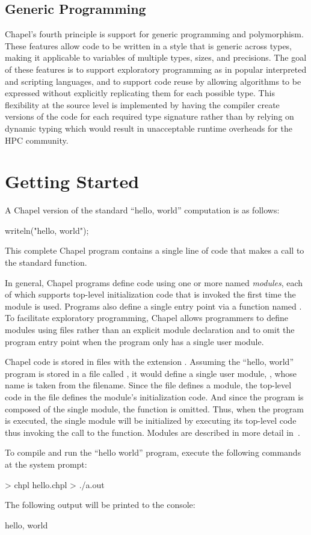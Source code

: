 \subsection{Generic Programming}
\label{Generic_Programming}

Chapel's fourth principle is support for generic programming and
polymorphism.  These features allow code to be written in a style that
is generic across types, making it applicable to variables of multiple
types, sizes, and precisions.  The goal of these features is to
support exploratory programming as in popular interpreted and
scripting languages, and to support code reuse by allowing algorithms
to be expressed without explicitly replicating them for each possible
type.  This flexibility at the source level is implemented by having
the compiler create versions of the code for each required type
signature rather than by relying on dynamic typing which would result
in unacceptable runtime overheads for the HPC community.

\section{Getting Started}
\label{Getting_Started}

A Chapel version of the standard ``hello, world'' computation is as
follows:
\vspace{0.5pc}
\begin{chapel}
writeln("hello, world");
\end{chapel}
This complete Chapel program contains a single line of code that makes
a call to the standard  function.


In general, Chapel programs define code using one or more named
\emph{modules}, each of which supports top-level initialization code
that is invoked the first time the module is used.  Programs also
define a single entry point via a function named .  To
facilitate exploratory programming, Chapel allows programmers to
define modules using files rather than an explicit module declaration
and to omit the program entry point when the program only has a single
user module.

Chapel code is stored in files with the extension .
Assuming the ``hello, world'' program is stored in a file
called , it would define a single user
module, , whose name is taken from the filename.  Since
the file defines a module, the top-level code in the file defines the
module's initialization code.  And since the program is composed of
the single  module, the  function is omitted.
Thus, when the program is executed, the single  module
will be initialized by executing its top-level code thus invoking the
call to the  function.  Modules are described in more
detail in~.

To compile and run the ``hello world'' program, execute the following
commands at the system prompt:
\begin{commandline} 
> chpl hello.chpl
> ./a.out
\end{commandline}
The following output will be printed to the console:
\begin{commandline}
hello, world
\end{commandline}
